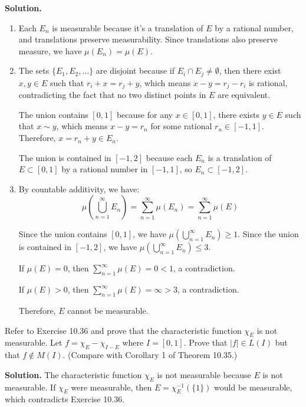 \noindent\textbf{Solution.}
\begin{enumerate}[label=(\alph*)]
    \item Each $E_n$ is measurable because it's a translation of $E$ by a rational number, and translations preserve measurability. Since translations also preserve measure, we have $\mu(E_n) = \mu(E)$.
    
    \item The sets $\{E_1, E_2, \ldots \}$ are disjoint because if $E_i \cap E_j \neq \emptyset$, then there exist $x, y \in E$ such that $r_i + x = r_j + y$, which means $x - y = r_j - r_i$ is rational, contradicting the fact that no two distinct points in $E$ are equivalent.
    
    The union contains $[0, 1]$ because for any $x \in [0, 1]$, there exists $y \in E$ such that $x \sim y$, which means $x - y = r_n$ for some rational $r_n \in [-1, 1]$. Therefore, $x = r_n + y \in E_n$.
    
    The union is contained in $[-1, 2]$ because each $E_n$ is a translation of $E \subset [0, 1]$ by a rational number in $[-1, 1]$, so $E_n \subset [-1, 2]$.
    
    \item By countable additivity, we have:
    \[\mu\left(\bigcup_{n=1}^{\infty} E_n\right) = \sum_{n=1}^{\infty} \mu(E_n) = \sum_{n=1}^{\infty} \mu(E)\]
    
    Since the union contains $[0, 1]$, we have $\mu(\bigcup_{n=1}^{\infty} E_n) \geq 1$. Since the union is contained in $[-1, 2]$, we have $\mu(\bigcup_{n=1}^{\infty} E_n) \leq 3$.
    
    If $\mu(E) = 0$, then $\sum_{n=1}^{\infty} \mu(E) = 0 < 1$, a contradiction.
    
    If $\mu(E) > 0$, then $\sum_{n=1}^{\infty} \mu(E) = \infty > 3$, a contradiction.
    
    Therefore, $E$ cannot be measurable.
\end{enumerate}

\begin{problembox}
Refer to Exercise 10.36 and prove that the characteristic function $\chi_E$ is not measurable. Let $f = \chi_E - \chi_{I-E}$ where $I = [0, 1]$. Prove that $|f| \in L(I)$ but that $f \notin M(I)$. (Compare with Corollary 1 of Theorem 10.35.)
\end{problembox}

\noindent\textbf{Solution.}
The characteristic function $\chi_E$ is not measurable because $E$ is not measurable. If $\chi_E$ were measurable, then $E = \chi_E^{-1}(\{1\})$ would be measurable, which contradicts Exercise 10.36.

